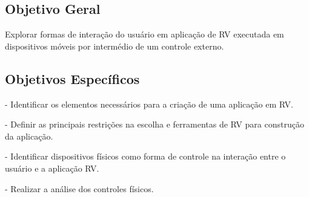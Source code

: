 \subsection{Objetivo Geral}
\label{s.geral}
Explorar formas de interação do usuário em aplicação de RV executada em dispositivos móveis por intermédio de um controle externo.

\subsection{Objetivos Específicos}
\label{s.especifico}
- Identificar os elementos necessários para a criação de uma aplicação em RV.

- Definir as principais restrições na escolha e ferramentas de RV para construção da aplicação.

- Identificar dispositivos físicos como forma de controle na interação entre o usuário e a aplicação RV.

- Realizar a análise dos controles físicos.
